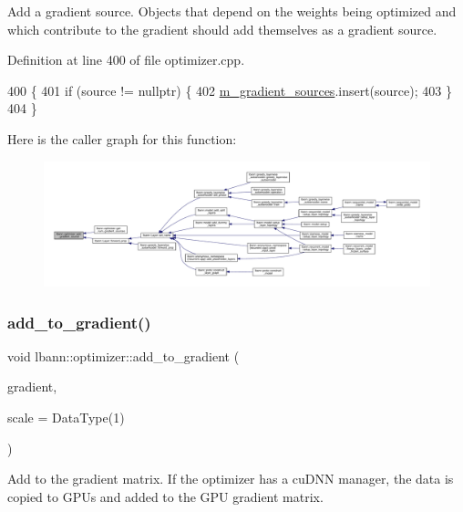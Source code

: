 Add a gradient source. Objects that depend on the weights being optimized and which contribute to the gradient should add themselves as a gradient source. 

Definition at line 400 of file optimizer.\+cpp.


\begin{DoxyCode}
400                                                       \{
401   \textcolor{keywordflow}{if} (source != \textcolor{keyword}{nullptr}) \{
402     \hyperlink{classlbann_1_1optimizer_aadfa322a683c2b826d0fae5f809298df}{m\_gradient\_sources}.insert(source);
403   \}
404 \}
\end{DoxyCode}
Here is the caller graph for this function\+:\nopagebreak
\begin{figure}[H]
\begin{center}
\leavevmode
\includegraphics[width=350pt]{classlbann_1_1optimizer_ade46d28f7df19cab6c6ee90c03e976ea_icgraph}
\end{center}
\end{figure}
\mbox{\label{classlbann_1_1optimizer_a435d31e3b7a0302e36439ee36f62dba8}} 
\subsubsection{\texorpdfstring{add\+\_\+to\+\_\+gradient()}{add\_to\_gradient()}}
{\footnotesize\ttfamily void lbann\+::optimizer\+::add\+\_\+to\+\_\+gradient (\begin{DoxyParamCaption}\item[{const \hyperlink{base_8hpp_a9a697a504ae84010e7439ffec862b470}{Abs\+Dist\+Mat} \&}]{gradient,  }\item[{Data\+Type}]{scale = {\ttfamily DataType(1)} }\end{DoxyParamCaption})}

Add to the gradient matrix. If the optimizer has a cu\+D\+NN manager, the data is copied to G\+P\+Us and added to the G\+PU gradient matrix. 

